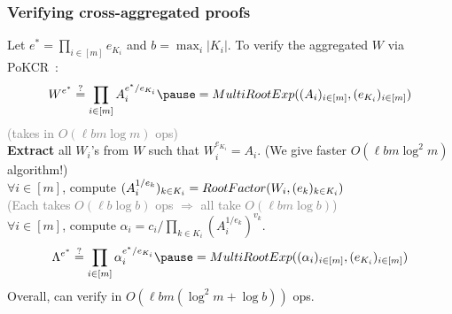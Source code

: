 \begin{frame}
    \frametitle{Verifying cross-aggregated proofs}
    Let $e^* = \prod_{i\in[m]} e_{K_i}$ and $b=\max_i{|K_i|}$.\pause\xspace
    To verify the aggregated $W$ via \alert{PoKCR}~\cite{BBF18}\pause:
    $$W^{e^*} \stackrel{?}{=} \prod_{i\in [m]} A_i^{e^* / e_{K_i}}\pause = \multirootexp((A_i)_{i\in[m]}, (e_{K_i})_{i\in [m]})$$\pause\noindent
    \textcolor{gray}{\small (\multirootexp takes in $O(\ell b m \log{m})$ \Gho ops)}\pause\\
    \textbf{Extract} all $W_i$'s from $W$ such that $W_i^{e_{K_i}} = A_i$.\pause\xspace
    \alert{(We give faster $O(\ell b m \log^2{m})$ algorithm!)}\pause\\
    $\forall i\in[m]$, compute $(A_i^{1/e_k})_{k\in K_i} = \mathsf\boldmath{RootFactor}(W_i, (e_k)_{k\in K_i})$\pause\\
    \textcolor{gray}{\small (Each \rootfactor takes $O(\ell b\log{b})$ \Gho ops $\Rightarrow$ all take $O(\ell b m \log{b})$)}\pause\\
    $\forall i\in[m]$, compute $\alpha_i = c_i / \prod_{k\in K_i} (A_i^{1/e_k})^{v_k}$.\pause\\
    $$\Lambda^{e^*} \stackrel{?}{=} \prod_{i\in [m]} \alpha_i^{e^*/e_{K_i}}\pause = \multirootexp((\alpha_i)_{i\in[m]}, (e_{K_i})_{i\in [m]})$$\pause
    \noindent
    Overall, can verify in $O(\ell b m (\log^2{m}+\log{b}))$ \Gho ops.
\end{frame}

